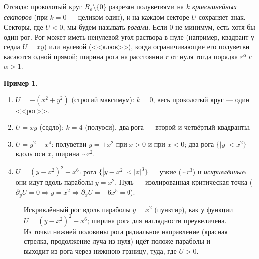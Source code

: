 \documentclass[11pt,a4paper]{article}
\theoremstyle{definition}
\newtheorem{example}[theorem]{Пример}
\newcommand{\term}[1]{\emph{#1}}
\begin{document}
Отсюда: проколотый круг $B_\rho\setminus\{0\}$ разрезан полуветвями на $k$ \term{криволинейных
секторов} (при $k=0$ --- целиком один), и на каждом секторе $U$ сохраняет знак. Секторы, где
$U<0$, мы будем называть \term{рогами}. Если $0$ не минимум, есть хотя бы один рог. Рог может
иметь ненулевой угол раствора в нуле (например, квадрант у седла $U=xy$) или нулевой
(<<клюв>>), когда ограничивающие его полуветви касаются одной прямой; ширина рога на
расстоянии $r$ от нуля тогда порядка $r^\alpha$ с $\alpha>1$.

\begin{example}\label{ex:horns}
\begin{enumerate}[leftmargin=*]
\item $U=-(x^2+y^2)$ (строгий максимум): $k=0$, весь проколотый круг --- один <<рог>>.
\item $U=xy$ (седло): $k=4$ (полуоси), два рога --- второй и четвёртый квадранты.
\item $U=y^2-x^4$: полуветви $y=\pm x^2$ при $x>0$ и при $x<0$; два рога $\{|y|<x^2\}$
вдоль оси $x$, ширина $\sim r^2$.
\item $U=(y-x^2)^2-x^6$: рога $\{|y-x^2|<|x|^3\}$ --- узкие ($\sim r^3$) и \emph{искривлённые}:
они идут вдоль параболы $y=x^2$. Нуль --- изолированная критическая точка
($\partial_yU=0\Rightarrow y=x^2\Rightarrow\partial_xU=-6x^5=0$).
\end{enumerate}
\end{example}

\begin{figure}[ht]
\centering
{}
\caption{Искривлённый рог вдоль параболы $y=x^2$ (пунктир), как у функции $U=(y-x^2)^2-x^6$;
ширина рога для наглядности преувеличена. Из точки нижней половины рога радиальное направление
(красная стрелка, продолжение луча из нуля) идёт положе параболы и выходит из рога через нижнюю
границу, туда, где $U>0$.}
\label{fig:horn}
\end{figure}
\end{document}
